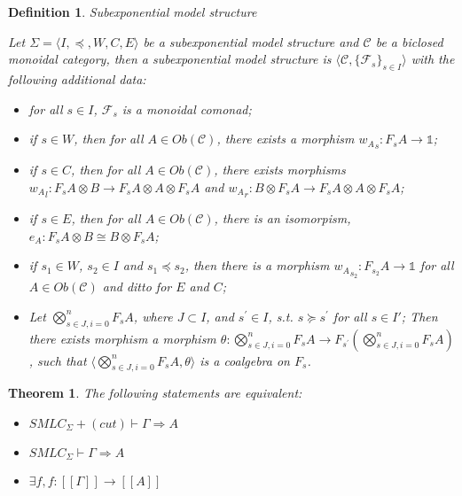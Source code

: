 \documentclass[a4paper]{article}
\newtheorem{theorem}{Theorem}
\newtheorem{defin}{Definition}
\begin{document}
\begin{defin} Subexponential model structure

  Let $\Sigma = \langle I, \preceq, W, C, E \rangle$ be a subexponential model structure and $\mathcal{C}$ be a biclosed monoidal category,
  then a subexponential model structure is $\langle \mathcal{C}, \{ \mathcal{F}_{s} \}_{s \in I} \rangle$ with the following additional data:

\begin{itemize}
  \item for all $s \in I$, $\mathcal{F}_s$ is a monoidal comonad;
  \item if $s \in W$, then for all $A \in Ob(\mathcal{C})$, there exists a morphism ${w_{A}}_{s} : F_s A \to \mathds{1}$;
  \item if $s \in C$, then for all $A \in Ob(\mathcal{C})$, there exists morphisms
${w_{A}}_{l} : F_s A \otimes B \to F_s A \otimes A \otimes F_s A$ and ${w_{A}}_{r} : B \otimes F_s A \to F_s A \otimes A \otimes F_s A$;
  \item if $s \in E$, then for all $A \in Ob(\mathcal{C})$, there is an isomorpism, ${e_A} : F_s A \otimes B \cong B \otimes F_s A$;
  \item if $s_1 \in W$, $s_2 \in I$ and $s_1 \preceq s_2$, then there is a morphism ${w_{A}}_{s_2} : F_{s_2} A \to \mathds{1}$ for all $A \in Ob(\mathcal{C})$ and ditto for $E$ and $C$;
  \item Let $\bigotimes_{s \in J, i = 0}^{n} F_{s} A$, where $J \subset I$, and $s^{'} \in I$, s.t. $s \succeq s^{'}$ for all $s \in I'$;
  Then there exists morphism a morphism $\theta : \bigotimes_{s \in J, i = 0}^{n} F_{s} A \to F_{s^{'}} (\bigotimes_{s \in J, i = 0}^{n} F_{s} A)$, such that
  $\langle \bigotimes_{s \in J, i = 0}^{n} F_{s} A, \theta \rangle$ is a coalgebra on $F_s$.
\end{itemize}
\end{defin}

\begin{theorem} The following statements are equivalent:

  \begin{itemize}
    \item $SMLC_{\Sigma} + (cut) \vdash \Gamma \Rightarrow A$
    \item $SMLC_{\Sigma} \vdash \Gamma \Rightarrow A$
    \item $\exists f, f : [\![\Gamma]\!] \rightarrow [\![A]\!]$
  \end{itemize}
\end{theorem}
\end{document}
